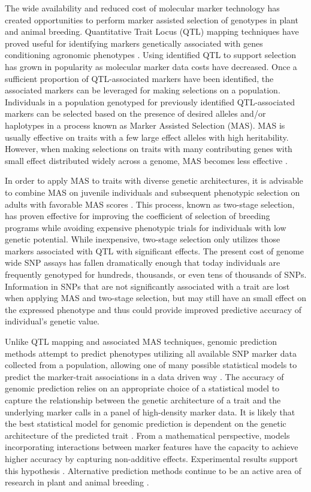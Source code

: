 
The wide availability and reduced cost of molecular marker technology
has created opportunities to perform marker assisted selection of genotypes
in plant and animal breeding. Quantitative Trait Locus (QTL) mapping techniques
have proved useful for identifying markers genetically associated with genes 
conditioning agronomic phenotypes \citep{miles2008}. Using identified QTL to
support selection has grown in popularity as molecular marker data costs have 
decreased. Once a sufficient proportion of QTL-associated markers have been identified, 
the associated markers can be leveraged for making selections on a population. 
Individuals in a population genotyped for previously identified QTL-associated
markers can be selected based on the presence of desired alleles 
and/or haplotypes in a process known as Marker Assisted Selection (MAS).
MAS is usually effective on traits with a few large effect alleles with high 
heritability. However, when making selections on traits with many contributing genes 
with small effect distributed widely across a genome, MAS becomes less 
effective \citep{heffner2009}.

In order to apply MAS to traits with diverse genetic architectures, it is
advisable to combine MAS on juvenile individuals and subsequent phenotypic
selection on adults with favorable MAS scores \citep{lande1990}. This process, 
known as two-stage selection, has proven effective for improving
the coefficient of selection of breeding programs while avoiding expensive phenotypic
trials for individuals with low genetic potential. While inexpensive, two-stage selection 
only utilizes those markers associated with QTL with significant effects. The present cost of
genome wide SNP assays has fallen dramatically enough that today individuals are
frequently genotyped for hundreds, thousands, or even tens of thousands of SNPs. 
Information in SNPs that are not significantly associated with a trait are lost 
when applying MAS and two-stage selection, but may still have an small effect on the
expressed phenotype and thus could provide improved predictive 
accuracy of individual's genetic value.

Unlike QTL mapping and associated MAS techniques, genomic prediction methods
attempt to predict phenotypes utilizing all available SNP marker data collected 
from a population, allowing one of many possible statistical models to predict 
the marker-trait associations in a data driven way \citep{meuwissen2001}. 
The accuracy of genomic prediction relies on an appropriate choice of a 
statistical model to capture the relationship between the genetic architecture
of a trait and the underlying marker calls in a panel of high-density marker 
data. It is likely that the best statistical model for genomic prediction is 
dependent on the genetic architecture of
the predicted trait \citep{crossa2010, gonzalez-camacho2012, 
resende2012, cleveland2012, thavamanikumar2015}.  From a mathematical perspective,
models incorporating interactions between marker features have the 
capacity to achieve higher accuracy by capturing non-additive effects.
Experimental results support this hypothesis \citep{gonzalez-camacho2012}. 
Alternative prediction methods continue to be an active area of research 
in plant and animal breeding \citep{koning2012}.


